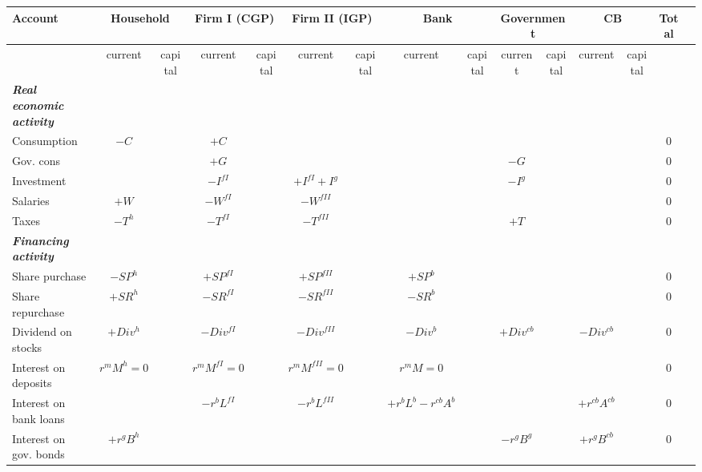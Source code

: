 \begin{landscape}
\thispagestyle{empty}
\begin{table}
  \centering\footnotesize
  \begin{tabular}{|l|c|c|c|c|c|c|c|c|c|c|c|c|c|c|}
  \hline\hline
    Account     & \multicolumn{2}{c|}{Household} & \multicolumn{2}{c|}{Firm I (CGP)} & \multicolumn{2}{c|}{Firm II (IGP)} & \multicolumn{2}{c|}{Bank} & \multicolumn{2}{c|}{Government}  & \multicolumn{2}{c|}{CB} & Total \\\hline
      & current & capital & current & capital & current & capital & current & capital & current & capital & current  & capital &  \\
    \hline
\textbf{\emph{Real economic activity}} &&&&&&&&&&&&&\\
    \hline
    Consumption & $-C$ &     & $+C$ & &     &       &       &       &       &     &       &      & 0\\\hline
    Gov. cons   &      &     & $+G$ & & &   &  &  & $-G$ & &  & & 0\\\hline
    Investment  &      &  & $-I^{fI}$ &  &  $+I^{fI}+I^g$ & &  &  & $-I^g$ & &  & & 0\\\hline
    Salaries    & $+W$ & & $-W^{fI}$ &  & $-W^{fII}$  &  &  &  &  & &  & & 0\\\hline
    Taxes       & $-T^h$ &  & $-T^{fI}$ &  & $-T^{fII}$ &  &  &  &  $+T$ & &  & & 0\\
    \hline
\textbf{\emph{Financing activity}}  &&&&&&&&&&&&&\\
    \hline
    Share purchase     & $-SP^h$ &   & $+SP^{fI}$ & & $+SP^{fII}$ &  & $+SP^{b}$ & & & & & &  0   \\\hline  
    Share repurchase   & $+SR^h$ &   & $-SR^{fI}$ & & $-SR^{fII}$ &  & $-SR^{b}$ & & & & & &  0\\\hline
    Dividend on stocks & $+Div^h$&   & $-Div^{fI}$& & $-Div^{fII}$&  & $-Div^{b}$& & $+Div^{cb}$ & & $-Div^{cb}$ & &  0\\\hline
    Interest on deposits & $r^{m}M^{h}=0$ &  & $r^{m}M^{fI}=0$ &  & $r^{m}M^{fII}=0$ & & $r^{m} M=0$ &  &  & &  & & 0\\\hline
    Interest on bank loans  &  &  & $-r^{b} L^{fI}$ &  & $-r^{b} L^{fII}$ &  & $+r^b L^b - r^{cb}A^b$ & &  & & $+r^{cb}A^{cb}$ & & 0\\\hline
    Interest on gov. bonds  & $+r^{g} B^h$ & &  &  &   &  &  & &  $-r^g B^g$ & & $+r^{g} B^{cb}$ & & 0\\

\end{tabular}
\end{table}
\end{landscape}
